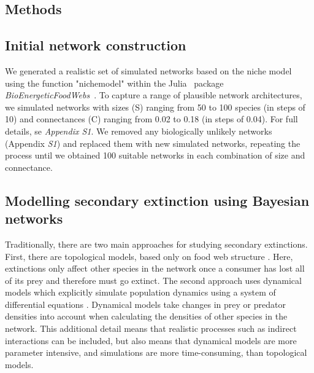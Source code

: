 \documentclass[12pt]{article}
\begin{document}
\begin{spacing}{2.0}
\section*{Methods}

	\subsection*{Initial network construction}

		We generated a realistic set of simulated networks based on the niche model~\citep{Williams2000,Stouffer2007} using the function "nichemodel" within the Julia~\citep{Bezanson2017julia} package \emph{BioEnergeticFoodWebs}~\citep{bioenergfw}. 
		To capture a range of plausible network architectures, we simulated networks with sizes (S) ranging from 50 to 100 species (in steps of 10) and connectances (C) ranging from 0.02 to 0.18 (in steps of 0.04). 
		For full details, se \emph{Appendix S1}.
		We removed any biologically unlikely networks (Appendix \emph{S1}) and replaced them with new simulated networks, repeating the process until we obtained 100 suitable networks in each combination of size and connectance.


    \subsection*{Modelling secondary extinction using Bayesian networks}

        Traditionally, there are two main approaches for studying secondary extinctions. First, there are topological models, based only on food web structure \citep{dunne2009cascading}. Here, extinctions only affect other species in the network once a consumer has lost all of its prey and therefore must go extinct. 
        The second approach uses dynamical models which explicitly simulate population dynamics using a system of differential equations \citep{binzer2011susceptibility}. Dynamical models take changes in prey or predator densities into account when calculating the densities of other species in the network. 
        This additional detail means that realistic processes such as indirect interactions can be included, but also means that dynamical models are more parameter intensive, and simulations are more time-consuming, than topological models. 
        

\end{spacing}
\end{document}
